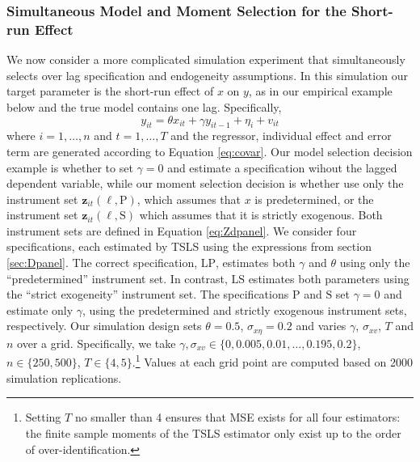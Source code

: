 \subsubsection{Simultaneous Model and Moment Selection for the Short-run Effect}
\label{sec:Dpanel_sim_SR}
We now consider a more complicated simulation experiment that simultaneously selects over lag specification and endogeneity assumptions. 
In this simulation our target parameter is the short-run effect of $x$ on $y$, as in our empirical example below and the true model contains one lag.
Specifically, 
\[
  y_{it} = \theta x_{it} + \gamma y_{it-1}  + \eta_i + v_{it}
\]
where $i = 1, \dots, n$ and $t = 1, \dots, T$ and the regressor, individual effect and error term are generated according to Equation \ref{eq:covar}.
Our model selection decision example is whether to set $\gamma = 0$ and estimate a specification wihout the lagged dependent variable, while our moment selection decision is whether use only the instrument set $\mathbf{z}_{it}(\ell,\text{P})$, 
which assumes that $x$ is predetermined, or the instrument set $\mathbf{z}_{it}(\ell,\text{S})$ which assumes that it is strictly exogenous.
Both instrument sets are defined in Equation \ref{eq:Zdpanel}.
We consider four specifications, each estimated by TSLS using the expressions from section \ref{sec:Dpanel}.
The correct specification, $\text{LP}$, estimates both $\gamma$ and $\theta$ using only the ``predetermined'' instrument set.
In contrast, $\text{LS}$ estimates both parameters using the ``strict exogeneity'' instrument set.
The specifications $\text{P}$ and $\text{S}$ set $\gamma=0$ and estimate only $\gamma$, using the predetermined and strictly exogenous instrument sets, respectively.
Our simulation design sets $\theta = 0.5$, $\sigma_{x\eta}=0.2$ and varies  $\gamma$, $\sigma_{xv}$, $T$ and $n$ over a grid.
Specifically, we take $\gamma, \sigma_{xv} \in \{0, 0.005, 0.01, \hdots, 0.195, 0.2\}$, $n \in \{250,500\}$, $T \in \{4,5\}$.\footnote{Setting $T$ no smaller than 4 ensures that MSE exists for all four estimators: the finite sample moments of the TSLS estimator only exist up to the order of over-identification.}
Values at each grid point are computed based on 2000 simulation replications.

